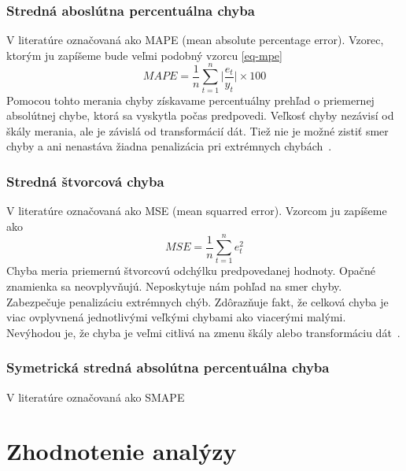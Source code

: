 \documentclass[a4paper,slovak,12pt,appendix]{article}
\begin{document}
\subsubsection{Stredná aboslútna percentuálna chyba}
\label{mape}
V literatúre označovaná ako MAPE (mean absolute percentage error). Vzorec,
ktorým ju zapíšeme bude veľmi podobný vzorcu \ref{eq-mpe}
\begin{equation}
  MAPE = \frac{1}{n} \sum_{t=1}^{n} \Big|\frac{e_t}{y_t}\Big| \times 100
  \label{eq-mape}
\end{equation}
Pomocou tohto merania chyby získavame percentuálny prehľad o priemernej
absolútnej chybe, ktorá sa vyskytla počas predpovedi. Veľkosť chyby nezávisí od
škály merania, ale je závislá od transformácií dát. Tiež nie je možné zistiť
smer chyby a ani nenastáva žiadna penalizácia pri extrémnych
chybách~\cite{Agrawal2013}.

\subsubsection{Stredná štvorcová chyba}
V literatúre označovaná ako MSE (mean squarred error). Vzorcom ju zapíšeme ako
\begin{equation}
  MSE = \frac{1}{n} \sum_{t=1}^{n} e_t^2
  \label{eq-mse}
\end{equation}
Chyba meria priemernú štvorcovú odchýlku predpovedanej hodnoty. Opačné
znamienka sa neovplyvňujú. Neposkytuje nám pohľad na smer chyby. Zabezpečuje
penalizáciu extrémnych chýb. Zdôrazňuje fakt, že celková chyba je viac
ovplyvnená jednotlivými veľkými chybami ako viacerými malými. Nevýhodou je, že
chyba je veľmi citlivá na zmenu škály alebo transformáciu
dát~\cite{Agrawal2013}.

\subsubsection{Symetrická stredná absolútna percentuálna chyba}
V literatúre označovaná ako SMAPE


\newpage
\section{Zhodnotenie analýzy}

\end{document}
